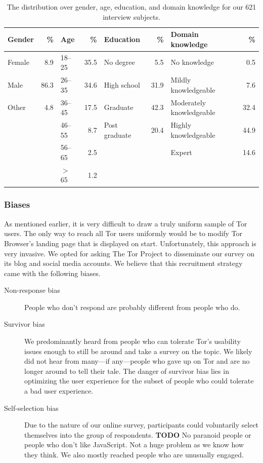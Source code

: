 \begin{table}[t]
	\centering
	\begin{tabular}{l r l r l r l r}
	\toprule
	Gender & \% &
	Age & \% &
	Education & \% &
	Domain knowledge & \% \\
	\midrule
	Female & 8.9  & 18--25   & 35.5 & No degree     & 5.5  & No knowledge             & 0.5  \\
	Male   & 86.3 & 26--35   & 34.6 & High school   & 31.9 & Mildly knowledgeable     & 7.6  \\
	Other  & 4.8  & 36--45   & 17.5 & Graduate      & 42.3 & Moderately knowledgeable & 32.4 \\
	       &      & 46--55   & 8.7  & Post graduate & 20.4 & Highly knowledgeable     & 44.9 \\
	       &      & 56--65   & 2.5  &               &      & Expert                   & 14.6 \\
	       &      & $>$ 65   & 1.2  &               &      & & \\
	\bottomrule
	\end{tabular}
	\caption{The distribution over gender, age, education, and domain knowledge 
	for our 621 interview subjects.}
	\label{tab:survey-demo}
\end{table}


\subsubsection{Biases}

As mentioned earlier, it is very difficult to draw a truly uniform sample of Tor
users.  The only way to reach all Tor users uniformly would be to modify Tor
Browser's landing page that is displayed on start.  Unfortunately, this approach
is very invasive.  We opted for asking The Tor Project to disseminate our survey
on its blog and social media accounts.  We believe that this recruitment
strategy came with the following biases.

\begin{description}
    \item[Non-response bias] People who don't respond are probably different
        from people who do.

    \item[Survivor bias] We predominantly heard from people who can tolerate
        Tor's usability issues enough to still be around and take a survey on
        the topic.  We likely did not hear from many---if any---people who gave
        up on Tor and are no longer around to tell their tale.  The danger of
        survivor bias lies in optimizing the user experience for the subset of
        people who could tolerate a bad user experience.

    \item[Self-selection bias] Due to the nature of our online survey,
        participants could voluntarily select themselves into the group of
        respondents. \textbf{TODO}
        No paranoid people or people who don't like
        JavaScript.  Not a huge problem as we know how they think.  We also
        mostly reached people who are unusually engaged.
\end{description}

